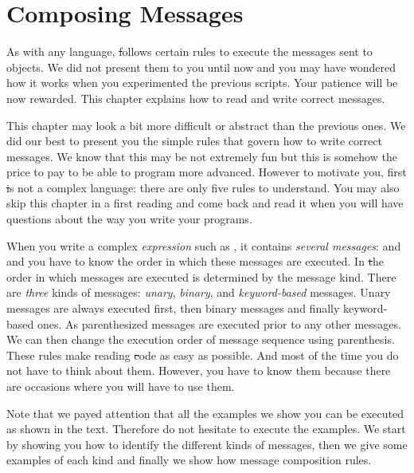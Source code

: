 
\ifx\wholebook\relax\else



\fi

\chapter{Composing Messages}\label{ch:Evaluating}\label{cha:evaluating}

As with any language,  \st follows certain rules to execute the messages sent to objects. We did not present them to you until now and you may have wondered how it works when you experimented the previous scripts. Your patience will be now rewarded. This chapter explains how to read and write correct messages. 

This chapter may look a bit more difficult or abstract than the previous ones. We did our best to present you the simple rules that govern how to write correct messages. We know that this may be not extremely fun but this is somehow the price to pay to be able to program more advanced. 
However to motivate you, first \st is not a complex language: there are only five rules to understand. You may also skip this chapter in a first reading and come back and read it when you will have questions about the way you write your programs. 


When you write a complex \emph{expression} such  as , it contains \emph{several messages}:  and \ct{+} and you have to know the order in which these messages are executed.  In \st the order in which messages are executed is determined by the message kind. There are \emph{three} kinds of messages: \emph{unary}, \emph{binary}, and \emph{keyword-based} messages. Unary messages are always executed first, then binary messages and finally keyword-based ones. As parenthesized messages are executed prior to any other messages.  We can then change the execution order of message sequence using parenthesis. These rules make reading \st code as easy as possible. And most of the time you do not have to think about them. However, you have to know them because there are occasions where you will have to use them.  

Note that we payed attention that all the examples we show you can be executed as shown in the text. Therefore do not hesitate to execute the examples. We start by showing you how to identify the different kinds of messages, then we give some examples of each kind and finally we show how message composition rules. 


